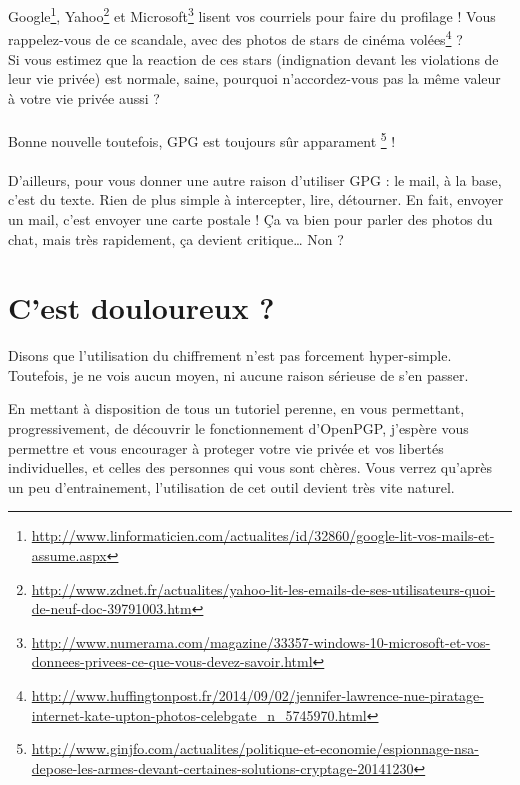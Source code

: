 Google\footnote{\url{http://www.linformaticien.com/actualites/id/32860/google-lit-vos-mails-et-assume.aspx}},
Yahoo\footnote{\url{http://www.zdnet.fr/actualites/yahoo-lit-les-emails-de-ses-utilisateurs-quoi-de-neuf-doc-39791003.htm}}
et Microsoft\footnote{\url{http://www.numerama.com/magazine/33357-windows-10-microsoft-et-vos-donnees-privees-ce-que-vous-devez-savoir.html}} lisent vos courriels pour faire du profilage ! Vous rappelez-vous de ce scandale, avec des photos de stars de cinéma volées\footnote{\url{http://www.huffingtonpost.fr/2014/09/02/jennifer-lawrence-nue-piratage-internet-kate-upton-photos-celebgate_n_5745970.html}} ?\\Si vous estimez que la reaction de ces stars (indignation devant les violations de leur vie privée) est
normale, saine, pourquoi n'accordez-vous pas la même valeur à votre vie privée aussi ?\\
\\
Bonne nouvelle toutefois, GPG est toujours sûr apparament
\footnote{\url{http://www.ginjfo.com/actualites/politique-et-economie/espionnage-nsa-depose-les-armes-devant-certaines-solutions-cryptage-20141230}} !\\
\\
D'ailleurs, pour vous donner une autre raison d'utiliser GPG : le mail, à la base, c'est du texte. Rien de plus simple à intercepter, lire,
détourner. En fait, envoyer un mail, c'est envoyer une carte postale ! Ça va bien pour parler des photos du chat, mais très rapidement, ça
devient critique\ldots{} Non ?

\section{C'est douloureux ?}\label{cest-douloureux}

Disons que l'utilisation du chiffrement n'est pas forcement hyper-simple. Toutefois, je ne vois aucun moyen, ni
aucune raison sérieuse de s'en passer.

En mettant à disposition de tous un tutoriel perenne, en vous
permettant, progressivement, de découvrir le fonctionnement d'OpenPGP,
j'espère vous permettre et vous encourager à proteger votre vie privée
et vos libertés individuelles, et celles des personnes qui vous sont
chères. Vous verrez qu'après un peu d'entrainement, l'utilisation de cet outil
devient très vite naturel.
